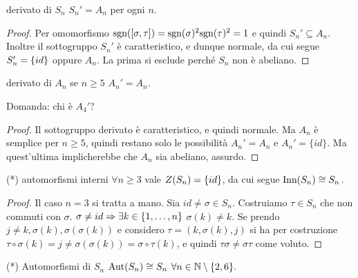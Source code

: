 \begin{proposition}{derivato di $S_n$}
    $S_n' = A_n$ per ogni $n$.    
\end{proposition}
\begin{proof}
    Per omomorfismo $\text{sgn}([\sigma, \tau]) = \text{sgn}(\sigma)^2\text{sgn}(\tau)^2 = 1$ e quindi $S_n' \subseteq A_n$. \\ Inoltre il sottogruppo $S_n'$ è caratteristico, e dunque normale, da cui segue $S_n' = \left\{ id \right\}$ oppure $A_n$. La prima si esclude perché $S_n$ non è abeliano. 
\end{proof}
\begin{proposition}{derivato di $A_n$}
    se $n \geq 5$ $A_n' = A_n$.
    
    Domanda: chi è $A_4'$?
\end{proposition}
\begin{proof}
    Il sottogruppo derivato è caratteristico, e quindi normale. Ma $A_n$ è semplice per $n\ge5 $, quindi restano solo le possibilità $A_n' = A_n$ e $A_n' = \{ id\}$. Ma quest'ultima implicherebbe che $A_n$ sia abeliano, assurdo. 
\end{proof}
\hypertarget{InnSn}{\begin{proposition}{(*) automorfismi interni}
    $\forall n\geq3$ vale $Z(S_n) = \left\{ id \right\}$, da cui segue $\text{Inn}(S_n) \cong S_n$. 
\end{proposition}}
\begin{proof}
    Il caso $n = 3$ si tratta a mano. Sia $id \neq \sigma \in S_n$. Costruiamo $\tau \in S_n$ che non commuti con $\sigma$. $\sigma \neq id \Rightarrow \exists k \in \left\{ 1, \dots, n \right\}$ $\sigma(k) \neq k$. Se prendo $j \neq k,\sigma(k),\sigma(\sigma(k))$ e considero $\tau = (k, \sigma(k), j)$ si ha per costruzione $\tau\circ\sigma(k) = j \neq \sigma(\sigma(k)) = \sigma\circ\tau(k)$, e quindi $\tau\sigma \neq \sigma\tau $ come voluto.
\end{proof}
\begin{proposition}{(*) Automorfismi di $S_n$}
    $\text{Aut}(S_n) \cong S_n$ $\forall n \in \mathbb{N} \setminus \{2, 6\}.$
\end{proposition}
